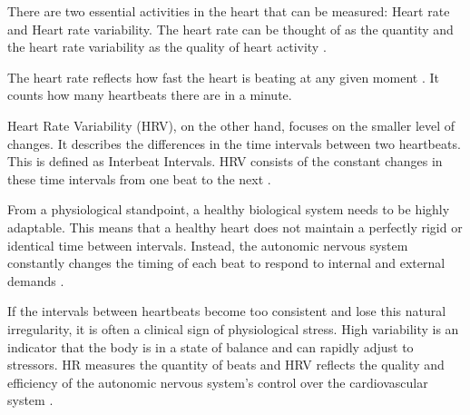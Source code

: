 There are two essential activities in the heart that can be measured: Heart rate and Heart rate variability. The heart rate can be thought of as the quantity and the heart rate variability as the quality of heart activity \cite{shaffer2017overview}.

The heart rate reflects how fast the heart is beating at any given moment . It counts how many heartbeats there are in a minute.

Heart Rate Variability (HRV), on the other hand, focuses on the smaller level of changes. It describes  the differences in the time intervals between two heartbeats. This is defined as Interbeat Intervals. HRV consists of the constant changes in these time intervals from one beat to the next \cite{shaffer2017overview}.

From a physiological standpoint, a healthy biological system needs to be highly adaptable. This means that a healthy heart does not maintain a perfectly rigid or identical time between intervals. Instead, the autonomic nervous system constantly changes the timing of each beat to respond to internal and external demands \cite{shaffer2017overview}.

If the intervals between heartbeats become too consistent and lose this natural irregularity, it is often a clinical sign of physiological stress. High variability is an indicator that the body is in a state of balance and can rapidly adjust to stressors. HR measures the quantity of beats and HRV reflects the quality and efficiency of the autonomic nervous system’s control over the cardiovascular system \cite{shaffer2017overview}.

